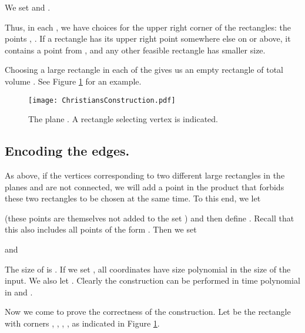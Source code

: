 \documentclass[12pt]{article}
\begin{document}
We set  and . 

Thus, in each , we have  choices for the upper right corner of the rectangles: the points , .
If a rectangle has its upper right point somewhere
else on  or above, it contains a point from , and any other
feasible rectangle has smaller size. 

Choosing a large rectangle in
each of the  gives us an empty rectangle of total volume . See
Figure \ref{fig:ChristiansConstruction} for an example.

\begin{figure}[htbp]
	\centering
		\texttt{[image: ChristiansConstruction.pdf]}
	\caption{The plane . A rectangle selecting vertex  is indicated.}
	\label{fig:ChristiansConstruction}
\end{figure}

\subsection{Encoding the edges.}
As above, if the vertices corresponding to two different large rectangles in
the planes  and  are not connected, we will add a point in
the product  that forbids these two rectangles to be chosen at
the same time. To this end, we let 
 
(these points are themselves not added to the set )
and then define .
Recall that this also includes all points of the form . Then we set

and
 
The size of  is . If we set , all coordinates have size polynomial in the size
of the input. We also let . Clearly the construction can be
performed in time polynomial in  and .

Now we come to prove the correctness of the construction. Let  be the rectangle with corners , , , , as indicated in Figure \ref{fig:ChristiansConstruction}.
\end{document}
